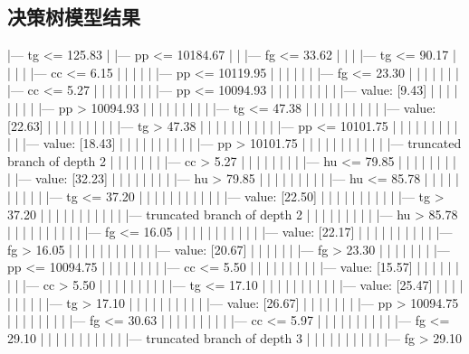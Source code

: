 \documentclass[UTF8, a4paper]{ctexart}
\begin{document}
\subsection{决策树模型结果}\label{tree_result}
|--- tg <= 125.83
|   |--- pp <= 10184.67
|   |   |--- fg <= 33.62
|   |   |   |--- tg <= 90.17
|   |   |   |   |--- cc <= 6.15
|   |   |   |   |   |--- pp <= 10119.95
|   |   |   |   |   |   |--- fg <= 23.30
|   |   |   |   |   |   |   |--- cc <= 5.27
|   |   |   |   |   |   |   |   |--- pp <= 10094.93
|   |   |   |   |   |   |   |   |   |--- value: [9.43]
|   |   |   |   |   |   |   |   |--- pp >  10094.93
|   |   |   |   |   |   |   |   |   |--- tg <= 47.38
|   |   |   |   |   |   |   |   |   |   |--- value: [22.63]
|   |   |   |   |   |   |   |   |   |--- tg >  47.38
|   |   |   |   |   |   |   |   |   |   |--- pp <= 10101.75
|   |   |   |   |   |   |   |   |   |   |   |--- value: [18.43]
|   |   |   |   |   |   |   |   |   |   |--- pp >  10101.75
|   |   |   |   |   |   |   |   |   |   |   |--- truncated branch of depth 2
|   |   |   |   |   |   |   |--- cc >  5.27
|   |   |   |   |   |   |   |   |--- hu <= 79.85
|   |   |   |   |   |   |   |   |   |--- value: [32.23]
|   |   |   |   |   |   |   |   |--- hu >  79.85
|   |   |   |   |   |   |   |   |   |--- hu <= 85.78
|   |   |   |   |   |   |   |   |   |   |--- tg <= 37.20
|   |   |   |   |   |   |   |   |   |   |   |--- value: [22.50]
|   |   |   |   |   |   |   |   |   |   |--- tg >  37.20
|   |   |   |   |   |   |   |   |   |   |   |--- truncated branch of depth 2
|   |   |   |   |   |   |   |   |   |--- hu >  85.78
|   |   |   |   |   |   |   |   |   |   |--- fg <= 16.05
|   |   |   |   |   |   |   |   |   |   |   |--- value: [22.17]
|   |   |   |   |   |   |   |   |   |   |--- fg >  16.05
|   |   |   |   |   |   |   |   |   |   |   |--- value: [20.67]
|   |   |   |   |   |   |--- fg >  23.30
|   |   |   |   |   |   |   |--- pp <= 10094.75
|   |   |   |   |   |   |   |   |--- cc <= 5.50
|   |   |   |   |   |   |   |   |   |--- value: [15.57]
|   |   |   |   |   |   |   |   |--- cc >  5.50
|   |   |   |   |   |   |   |   |   |--- tg <= 17.10
|   |   |   |   |   |   |   |   |   |   |--- value: [25.47]
|   |   |   |   |   |   |   |   |   |--- tg >  17.10
|   |   |   |   |   |   |   |   |   |   |--- value: [26.67]
|   |   |   |   |   |   |   |--- pp >  10094.75
|   |   |   |   |   |   |   |   |--- fg <= 30.63
|   |   |   |   |   |   |   |   |   |--- cc <= 5.97
|   |   |   |   |   |   |   |   |   |   |--- fg <= 29.10
|   |   |   |   |   |   |   |   |   |   |   |--- truncated branch of depth 3
|   |   |   |   |   |   |   |   |   |   |--- fg >  29.10
\end{document}
